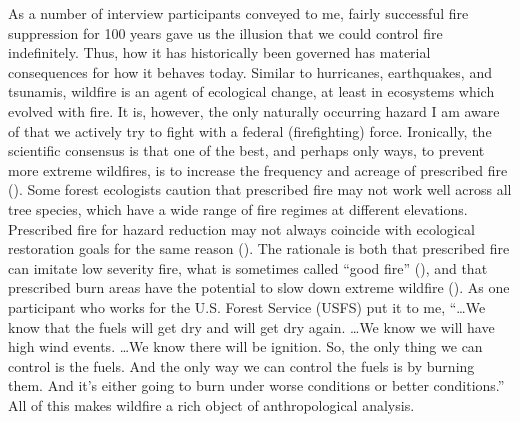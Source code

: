 \documentclass[
]{article}
\begin{document}
As a number of interview participants conveyed to me, fairly successful fire suppression for 100 years gave us the illusion that we could control fire indefinitely. Thus, how it has historically been governed has material consequences for how it behaves today. Similar to hurricanes, earthquakes, and tsunamis, wildfire is an agent of ecological change, at least in ecosystems which evolved with fire. It is, however, the only naturally occurring hazard I am aware of that we actively try to fight with a federal (firefighting) force. Ironically, the scientific consensus is that one of the best, and perhaps only ways, to prevent more extreme wildfires, is to increase the frequency and acreage of prescribed fire (). Some forest ecologists caution that prescribed fire may not work well across all tree species, which have a wide range of fire regimes at different elevations. Prescribed fire for hazard reduction may not always coincide with ecological restoration goals for the same reason (). The rationale is both that prescribed fire can imitate low severity fire, what is sometimes called ``good fire'' (), and that prescribed burn areas have the potential to slow down extreme wildfire (). As one participant who works for the U.S. Forest Service (USFS) put it to me, ``\ldots We know that the fuels will get dry and will get dry again. \ldots We know we will have high wind events. \ldots We know there will be ignition. So, the only thing we can control is the fuels. And the only way we can control the fuels is by burning them. And it's either going to burn under worse conditions or better conditions.'' All of this makes wildfire a rich object of anthropological analysis.
\end{document}
